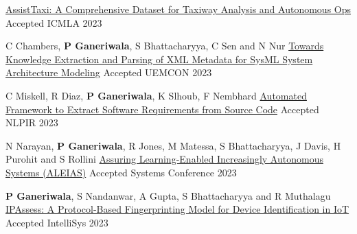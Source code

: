 \begin{cventries}
{\href{https://ieeexplore.ieee.org/abstract/document/10459875}{AssistTaxi: A Comprehensive Dataset for Taxiway Analysis and Autonomous Ops}}
{Accepted}
{ICMLA 2023} 
{ %
\begin{cvitems}
\end{cvitems}
}
\cventry
{C Chambers, \textbf{P Ganeriwala}, S Bhattacharyya, C Sen and N Nur }
{\href{https://ieeexplore.ieee.org/abstract/document/10316143}{Towards Knowledge Extraction and Parsing of XML Metadata for SysML System Architecture Modeling}}
{Accepted}
{UEMCON 2023} 
{ %
\begin{cvitems}
\end{cvitems}
}
\cventry
{C Miskell, R Diaz, \textbf{P Ganeriwala}, K Slhoub, F Nembhard}
{\href{https://dl.acm.org/doi/abs/10.1145/3639233.3639242}{Automated Framework to Extract Software Requirements from Source Code}}
{Accepted}
{NLPIR 2023} 
{ %
\begin{cvitems}
\end{cvitems}
}
\cventry
{N Narayan, \textbf{P Ganeriwala}, R Jones, M Matessa, S Bhattacharyya, J Davis, H Purohit and S Rollini}
{\href{https://ieeexplore.ieee.org/abstract/document/10131227}{Assuring Learning-Enabled Increasingly Autonomous Systems (ALEIAS)}}
{Accepted}
{Systems Conference 2023} 
{ %
\begin{cvitems}
\end{cvitems}
}
\cventry
{\textbf{P Ganeriwala}, S Nandanwar, A Gupta, S Bhattacharyya and R Muthalagu}
{\href{https://link.springer.com/chapter/10.1007/978-3-031-47715-7_46}{IPAssess: A Protocol-Based Fingerprinting Model for Device Identification in IoT}}
{Accepted}
{IntelliSys 2023} 
{ %
\begin{cvitems}

\end{cvitems}}
\end{cventries}
